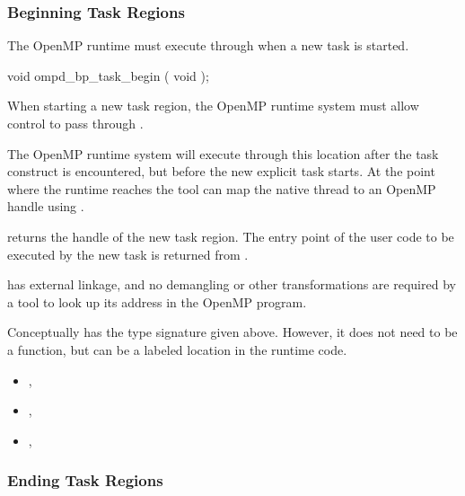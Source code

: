 \subsubsection{Beginning Task Regions}
\label{subsubsec:ompd_bp_task_begin}

The OpenMP runtime must execute through 
when a new task is started.


\begin{cspecific}
\begin{ompSyntax}
void ompd_bp_task_begin ( void );
\end{ompSyntax}
\end{cspecific}


\descr

When starting a new task region, the OpenMP runtime system
must allow control to pass through .

The OpenMP runtime system will execute through this location after the task
construct is encountered, but before the new explicit task starts.
At the point where the runtime reaches 
the tool can map the native thread to an OpenMP handle using
.

 returns the handle of the new task region.
The entry point of the user code to be executed by the new task
is returned from
.

\restrictions

 has external  linkage, and no
demangling or other transformations are required by a tool
to look up its address in the OpenMP program.

Conceptually  has the type signature
given above.
However, it does not need to be a function, but can be a labeled location
in the runtime code.

\crossreferences
\begin{itemize}
\item
  , 
\item
  , 
\item
  , 
\end{itemize}

\subsubsection{Ending Task Regions}
\label{subsubsec:ompd_bp_task_end}

